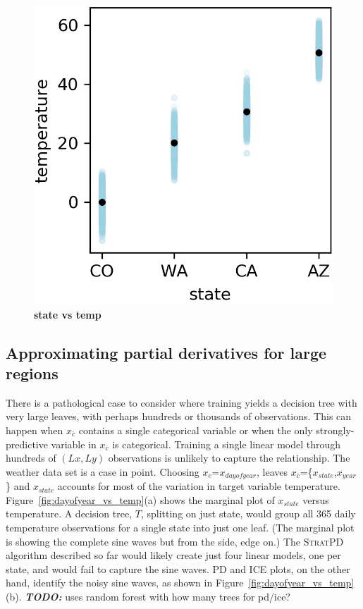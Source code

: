 \documentclass[12pt]{article}
\newcommand{\figref}[1]{Figure~\ref{#1}}
\newcommand{\todo}[1]{{\bf\em TODO:} {{#1}}}
\newcommand{\spd}{\fontfamily{cmr}\textsc{\small StratPD}}
\newcommand{\xnc}{$x_{\overline{c}}$}
\begin{document}
\begin{figure}[htbp]
\begin{center}
\includegraphics[scale=0.7]{images/state_vs_temp_pdp.png}
\caption{{\bf  state  vs temp}}
\label{fig:state_vs_temp}
\end{center}
\end{figure}

\subsection{Approximating partial derivatives for large regions}\label{sec:patho}

There is a pathological case to consider where training yields a decision tree with very large leaves, with perhaps hundreds or thousands of observations.  This can happen when \xnc{} contains a single categorical variable or when the only strongly-predictive variable in \xnc{} is categorical.  Training a single linear model through hundreds of $(Lx, Ly)$ observations is unlikely to capture the relationship.  The weather data set is a case in point. Choosing $x_c$=$x_{dayofyear}$, leaves \xnc{}=\{$x_{state}$,$x_{year}$\} and $x_{state}$ accounts for most of the variation in target variable temperature.  \figref{fig:dayofyear_vs_temp}(a) shows the marginal plot of $x_{state}$ versus temperature. A decision tree, $T$, splitting on just state, would group all 365 daily temperature observations for a single state into just one leaf. (The marginal plot is showing the complete sine waves but from the side, edge on.)  The \spd{} algorithm described so far would likely create just four linear models, one per state, and would fail to capture the sine waves. PD and ICE plots, on the other hand, identify the noisy sine waves, as shown in \figref{fig:dayofyear_vs_temp}(b). \todo{uses random forest with how many trees for pd/ice?}
\end{document}

